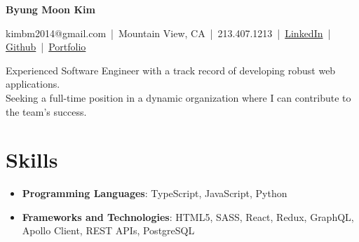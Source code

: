 \documentclass[a4paper,10pt]{article}
\begin{document}
\pagestyle{empty}

\begin{center}
    {\LARGE \textbf{Byung Moon Kim}}
\end{center}
\noindent \begin{center}
    kimbm2014@gmail.com \,|\, Mountain View, CA \,|\, 213.407.1213 \,|\, \href{https://www.linkedin.com/in/ray-kim0727}{LinkedIn} \,|\, \href{https://github.com/moonnada}{Github} \,|\, \href{https://raykim0727.vercel.app/}{Portfolio}
\end{center}

\vspace{1.5mm}

\begin{center}
    Experienced Software Engineer with a track record of developing robust web applications.\\
    Seeking a full-time position in a dynamic organization where I can contribute to the team’s success.
\end{center}

\vspace{1.5mm}

\section*{Skills}\vspace{0.5mm}
\begin{itemize}
    \item \textbf{Programming Languages}: TypeScript, JavaScript, Python\vspace{0.5ex}
    \item \textbf{Frameworks and Technologies}: HTML5, SASS, React, Redux, GraphQL, Apollo Client, REST APIs, PostgreSQL\vspace{0.5ex}    
\end{itemize}

\vspace{3mm}
\end{document}

